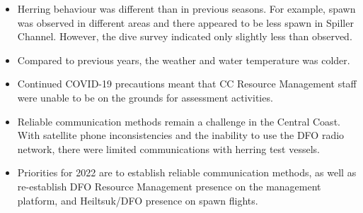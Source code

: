 \begin{itemize}
\item Herring behaviour was different than in previous seasons.
For example, spawn was observed in different areas and
there appeared to be less spawn in Spiller Channel.
However, the dive survey indicated only slightly less than observed.
\item Compared to previous years, the weather and water temperature was colder.
\item Continued COVID-19 precautions meant that CC Resource Management staff
were unable to be on the grounds for assessment activities.
\item Reliable communication methods remain a challenge in the Central Coast.
With satellite phone inconsistencies and the inability to use the DFO radio network,
there were limited communications with herring test vessels.
\item Priorities for 2022 are to establish reliable communication methods,
as well as re-establish DFO Resource Management presence on the management platform, 
and Heiltsuk/DFO presence on spawn flights.
\end{itemize}